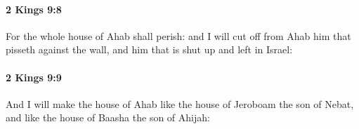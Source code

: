 		\paragraph{2 Kings 9:8} %
			\label{2KINGS-9-8}

			For the whole house of Ahab shall perish: and I will cut off from Ahab him that pisseth against the wall, and him that is shut up and left in Israel:


		\paragraph{2 Kings 9:9} %
			\label{2KINGS-9-9}

			And I will make the house of Ahab like the house of Jeroboam the son of Nebat, and like the house of Baasha the son of Ahijah:


